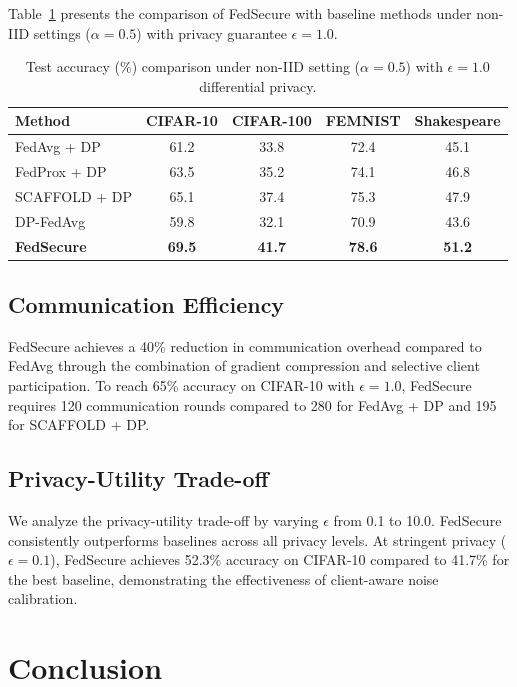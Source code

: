 \documentclass[conference]{IEEEtran}
\begin{document}
Table~\ref{tab:main_results} presents the comparison of FedSecure with baseline methods under non-IID settings ($\alpha = 0.5$) with privacy guarantee $\epsilon = 1.0$.

\begin{table}[t]
\centering
\caption{Test accuracy (\%) comparison under non-IID setting ($\alpha=0.5$) with $\epsilon=1.0$ differential privacy.}
\label{tab:main_results}
\begin{tabular}{@{}lcccc@{}}
\toprule
\textbf{Method} & \textbf{CIFAR-10} & \textbf{CIFAR-100} & \textbf{FEMNIST} & \textbf{Shakespeare} \\
\midrule
FedAvg + DP     & 61.2 & 33.8 & 72.4 & 45.1 \\
FedProx + DP    & 63.5 & 35.2 & 74.1 & 46.8 \\
SCAFFOLD + DP   & 65.1 & 37.4 & 75.3 & 47.9 \\
DP-FedAvg       & 59.8 & 32.1 & 70.9 & 43.6 \\
\midrule
\textbf{FedSecure} & \textbf{69.5} & \textbf{41.7} & \textbf{78.6} & \textbf{51.2} \\
\bottomrule
\end{tabular}
\end{table}

\subsection{Communication Efficiency}

FedSecure achieves a 40\% reduction in communication overhead compared to FedAvg through the combination of gradient compression and selective client participation. To reach 65\% accuracy on CIFAR-10 with $\epsilon = 1.0$, FedSecure requires 120 communication rounds compared to 280 for FedAvg + DP and 195 for SCAFFOLD + DP.

\subsection{Privacy-Utility Trade-off}

We analyze the privacy-utility trade-off by varying $\epsilon$ from 0.1 to 10.0. FedSecure consistently outperforms baselines across all privacy levels. At stringent privacy ($\epsilon = 0.1$), FedSecure achieves 52.3\% accuracy on CIFAR-10 compared to 41.7\% for the best baseline, demonstrating the effectiveness of client-aware noise calibration.

\section{Conclusion}
\end{document}

